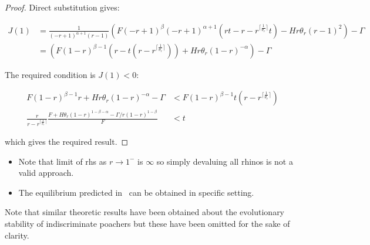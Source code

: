 \documentclass[10pt]{article}
\begin{document}
\begin{proof}
Direct substitution gives:

    \begin{align}
    J(1) &= \frac{1}{\left(- r + 1\right)^{\alpha + 1} \left(r - 1\right)}
                \left(
                    F \left(- r + 1\right)^{\beta}
                    \left(- r + 1\right)^{\alpha + 1}
                    \left(
                        r t -
                        r -
                        r^{\lceil{\frac{1}{\theta_{r}}}\rceil} t
                    \right)
                    - H r
                    \theta_{r}
                    \left(r - 1\right)^{2}
                \right) - \Gamma\\
		&= \left(F
                 \left(1 - r\right)^{\beta - 1}
                 \left(
                     r -
                     t(r - r^{\lceil{\frac{1}{\theta_{r}}}\rceil} )
                 \right) +
                 H r \theta_{r} \left(1 - r\right)^{-\alpha}
           \right)
           - \Gamma
    \end{align}

The required condition is \(J(1)<0\):

\begin{align}
    F
    \left(1 - r\right)^{\beta - 1}r +
    H r \theta_{r}
    \left(1 - r\right)^{-\alpha}
    - \Gamma
            & < F \left(1 - r\right)^{\beta - 1}
    t(r - r^{\lceil{\frac{1}{\theta_{r}}}\rceil} )\\
    \frac{r}{r - r^{\lceil{\frac{1}{\theta_{r}}}\rceil}}
    \frac{F + H \theta_{r} \left(1 - r\right)^{1-\beta-\alpha} -
    \Gamma/r(1-r)^{1-\beta}}{F} & < t
\end{align}

which gives the required result.

\end{proof}

\begin{itemize}
    \item Note that limit of rhs as \(r\to1^-\) is \(\infty\) so simply
        devaluing
        all rhinos is not a valid approach.
    \item The equilibrium predicted in~\cite{Lee} can be obtained in specific
        setting.
\end{itemize}

Note that similar theoretic results have been obtained about the evolutionary
stability of indiscriminate poachers but these have been omitted for the sake of
clarity.
\end{document}
